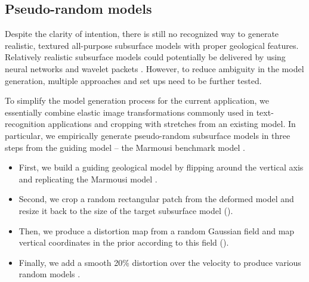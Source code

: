 \documentclass[paper,twocolomn]{geophysics}
\begin{document}
\subsection{Pseudo-random models}
Despite the clarity of intention, there is still no recognized way to generate realistic, textured all-purpose subsurface models with proper geological features.
%
Relatively realistic subsurface models could potentially be delivered by using neural networks \citep{ovcharenko2019style, wu2020building} and wavelet packets \citep{kazei2019realistically}. However, to reduce ambiguity in the model generation, multiple approaches and set ups need to be further tested.

To simplify the model generation process for the current application, we essentially combine elastic image transformations commonly used in text-recognition applications \citep{simard2003best} and cropping with stretches \citep{sunLowFrequencyExtrapolation2018} from an existing model.
%
In particular, we empirically generate pseudo-random subsurface models in three steps from the guiding model -- the Marmousi benchmark model \citep{marmousi1991}.

\begin{itemize}
%	
%	

	\item First, we build a guiding geological model by flipping around the vertical axis and replicating the Marmousi model .
	
	\item Second, we crop a random rectangular patch from the deformed model and resize it back to the size of the target subsurface model ().
	
	\item Then, we produce a distortion map  from a random Gaussian field and map vertical coordinates in the prior according to this field ().
	
	\item Finally, we add a smooth 20\% distortion over the velocity to produce various random models .
	
	
\end{itemize} 
\end{document}

